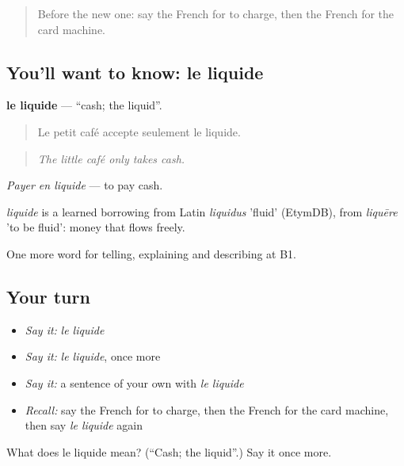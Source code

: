 \label{lesson:FR-C450-liquide}



\begin{quote}
Before the new one: say the French for to charge, then the French for the card machine.
\end{quote}

\subsection*{You'll want to know: le liquide}
\textbf{le liquide} — \textquotedblleft{}cash; the liquid\textquotedblright{}.

\begin{quote}
Le petit café accepte seulement le liquide.
\end{quote}

\begin{quote}
\emph{The little café only takes cash.}
\end{quote}

\emph{Payer en liquide} — to pay cash.

\begin{cousinweb}
\emph{liquide} is a learned borrowing from Latin \emph{liquidus} 'fluid' (EtymDB), from \emph{liquēre} 'to be fluid': money that flows freely.
\end{cousinweb}

\begin{grammarlens}[title={What you've built}]
One more word for telling, explaining and describing at B1.
\end{grammarlens}

\subsection*{Your turn}
\begin{itemize}
\raggedright
  \item \emph{Say it:} \emph{le liquide}
  \item \emph{Say it:} \emph{le liquide}, once more
  \item \emph{Say it:} a sentence of your own with \emph{le liquide}
  \item \emph{Recall:} say the French for to charge, then the French for the card machine, then say \emph{le liquide} again
\end{itemize}

\begin{tcolorbox}[breakable,colback=teal!4,colframe=teal!35!black,title={Before you move on}]
What does le liquide mean? (\textquotedblleft{}Cash; the liquid\textquotedblright{}.) Say it once more.
\end{tcolorbox}
